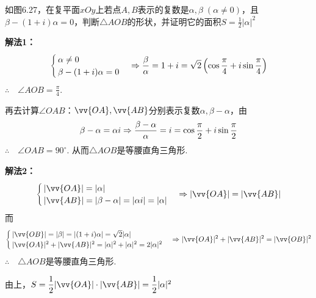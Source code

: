 \begin{example}
    如图6.27，在复平面$xOy$上若点$A,B$表示的复数是$\alpha,\beta\; (\alpha\ne 0)$，且$\beta-(1+i)\alpha=0$，判断$\triangle AOB$的形状，并证明它的面积$S=\frac{1}{2}|\alpha|^2$
\end{example}

\begin{figure}[htp]
    \centering
{}
    \caption{}
\end{figure}

\begin{solution}
\textbf{解法1：}
\[\begin{cases}
\alpha\ne 0\\
\beta-(1+i)\alpha=0
\end{cases}\Rightarrow \dfrac{\beta}{\alpha}=1+i=\sqrt{2}\left(\cos\dfrac{\pi}{4}+i\sin\dfrac{\pi}{4}\right)\]
$\therefore\quad \angle AOB=\frac{\pi}{4}$.

再去计算$\angle OAB$：$\vv{OA},\vv{AB}$分别表示复数$\alpha,\beta-\alpha$，由
\[\beta-\alpha=\alpha i\Rightarrow \dfrac{\beta-\alpha}{\alpha}=i=\cos\dfrac{\pi}{2}+i\sin\dfrac{\pi}{2}\]
$\therefore\quad \angle OAB=90^{\circ}$. 从而$\triangle AOB$是等腰直角三角形.

\textbf{解法2：}
\[\begin{cases}
    |\vv{OA}|=|\alpha|\\
    |\vv{AB}|=|\beta-\alpha|=|\alpha i|=|\alpha|
\end{cases}\Rightarrow  |\vv{OA}|=|\vv{AB}|\]
而
\[\begin{cases}
    |\vv{OB}|=|\beta|=|(1+i)\alpha|=\sqrt{2}|\alpha|\\
    |\vv{OA}|^2+|\vv{AB}|^2=|\alpha|^2+|\alpha|^2=2|\alpha|^2
\end{cases}\Rightarrow |\vv{OA}|^2+|\vv{AB}|^2=|\vv{OB}|^2\]
$\therefore\quad \triangle AOB$是等腰直角三角形.

由上，$S=\frac{1}{2}|\vv{OA}|\cdot |\vv{AB}|=\frac{1}{2}|\alpha|^2$
\end{solution}

